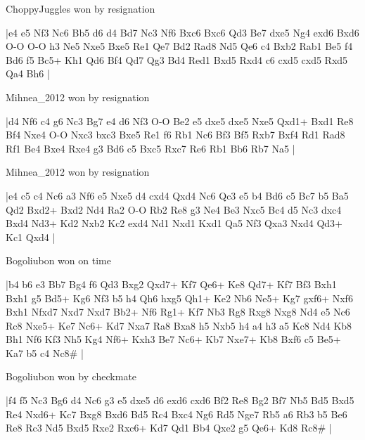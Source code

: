 \showboard

ChoppyJuggles won by resignation

\makegametitle
|e4 e5 Nf3 Nc6 Bb5 d6 d4 Bd7 Nc3 Nf6 Bxc6 Bxc6 Qd3 Be7 dxe5 Ng4 exd6 Bxd6 O-O O-O h3 Ne5 Nxe5 Bxe5 Re1 Qe7 Bd2 Rad8 Nd5 Qe6 c4 Bxb2 Rab1 Be5 f4 Bd6 f5 Bc5+ Kh1 Qd6 Bf4 Qd7 Qg3 Bd4 Red1 Bxd5 Rxd4 c6 cxd5 cxd5 Rxd5 Qa4 Bh6  |

\showboard

Mihnea\_2012 won by resignation

\makegametitle
|d4 Nf6 c4 g6 Nc3 Bg7 e4 d6 Nf3 O-O Be2 e5 dxe5 dxe5 Nxe5 Qxd1+ Bxd1 Re8 Bf4 Nxe4 O-O Nxc3 bxc3 Bxe5 Re1 f6 Rb1 Nc6 Bf3 Bf5 Rxb7 Bxf4 Rd1 Rad8 Rf1 Be4 Bxe4 Rxe4 g3 Bd6 c5 Bxc5 Rxc7 Re6 Rb1 Bb6 Rb7 Na5  |

\showboard

Mihnea\_2012 won by resignation

\makegametitle
|e4 c5 c4 Nc6 a3 Nf6 e5 Nxe5 d4 cxd4 Qxd4 Nc6 Qc3 e5 b4 Bd6 c5 Bc7 b5 Ba5 Qd2 Bxd2+ Bxd2 Nd4 Ra2 O-O Rb2 Re8 g3 Ne4 Be3 Nxc5 Bc4 d5 Nc3 dxc4 Bxd4 Nd3+ Kd2 Nxb2 Kc2 exd4 Nd1 Nxd1 Kxd1 Qa5 Nf3 Qxa3 Nxd4 Qd3+ Kc1 Qxd4  |

\showboard

Bogoliubon won on time

\makegametitle
|b4 b6 e3 Bb7 Bg4 f6 Qd3 Bxg2 Qxd7+ Kf7 Qe6+ Ke8 Qd7+ Kf7 Bf3 Bxh1 Bxh1 g5 Bd5+ Kg6 Nf3 b5 h4 Qh6 hxg5 Qh1+ Ke2 Nb6 Ne5+ Kg7 gxf6+ Nxf6 Bxh1 Nfxd7 Nxd7 Nxd7 Bb2+ Nf6 Rg1+ Kf7 Nb3 Rg8 Rxg8 Nxg8 Nd4 e5 Nc6 Rc8 Nxe5+ Ke7 Nc6+ Kd7 Nxa7 Ra8 Bxa8 h5 Nxb5 h4 a4 h3 a5 Kc8 Nd4 Kb8 Bh1 Nf6 Kf3 Nh5 Kg4 Nf6+ Kxh3 Be7 Nc6+ Kb7 Nxe7+ Kb8 Bxf6 c5 Be5+ Ka7 b5 c4 Nc8\#  |

\showboard

Bogoliubon won by checkmate

\makegametitle
|f4 f5 Nc3 Bg6 d4 Nc6 g3 e5 dxe5 d6 exd6 cxd6 Bf2 Re8 Bg2 Bf7 Nb5 Bd5 Bxd5 Re4 Nxd6+ Kc7 Bxg8 Bxd6 Bd5 Rc4 Bxc4 Ng6 Rd5 Nge7 Rb5 a6 Rb3 b5 Be6 Re8 Rc3 Nd5 Bxd5 Rxe2 Rxc6+ Kd7 Qd1 Bb4 Qxe2 g5 Qe6+ Kd8 Rc8\#  |

\showboard

